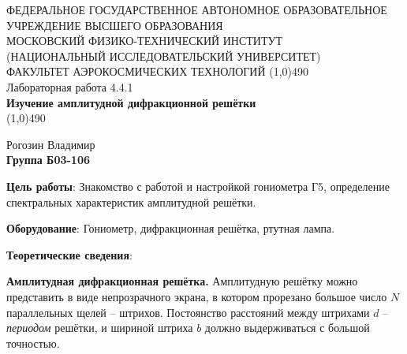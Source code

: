 \documentclass[a4paper,12pt]{article}
\begin{document}
\begin{titlepage}
\begin{center}
\large{\small ФЕДЕРАЛЬНОЕ ГОСУДАРСТВЕННОЕ АВТОНОМНОЕ ОБРАЗОВАТЕЛЬНОЕ\\ УЧРЕЖДЕНИЕ ВЫСШЕГО ОБРАЗОВАНИЯ \\ МОСКОВСКИЙ ФИЗИКО-ТЕХНИЧЕСКИЙ ИНСТИТУТ\\ (НАЦИОНАЛЬНЫЙ ИССЛЕДОВАТЕЛЬСКИЙ УНИВЕРСИТЕТ)\\ ФАКУЛЬТЕТ АЭРОКОСМИЧЕСКИХ ТЕХНОЛОГИЙ}
\vfill
\line(1,0){490}\\[1mm]
\huge{Лабораторная работа 4.4.1}\\
\huge\textbf{Изучение амплитудной дифракционной решётки}\\
\line(1,0){490}\\[1mm]
\vfill
\begin{flushright}
\normalsize{Рогозин Владимир}\\
\normalsize{\textbf{Группа Б03-106}}\\
\end{flushright}
\end{center}
\end{titlepage}

\textbf{Цель работы}: 
Знакомство с работой и настройкой гониометра Г5, определение спектральных характеристик амплитудной решётки.

\textbf{Оборудование}:
Гониометр, дифракционная решётка, ртутная лампа.

\textbf{Теоретические сведения}:

\textbf{Амплитудная дифракционная решётка.} Амплитудную решётку можно представить в виде непрозрачного экрана, в котором прорезано большое число $N$ параллельных щелей -- штрихов. Постоянство расстояний между штрихами $d$ -- \textit{периодом} решётки, и шириной штриха $b$ должно выдерживаться с большой точностью. 
\end{document}
